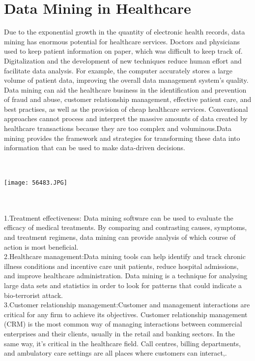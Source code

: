 \documentclass[12pt,letterpaper]{article}
\begin{document}
\section{Data Mining in Healthcare}
Due to the exponential growth in the quantity of electronic health records, data mining has enormous potential for healthcare services. Doctors and physicians used to keep patient information on paper, which was difficult to keep track of. Digitalization and the development of new techniques reduce human effort and facilitate data analysis. For example, the computer accurately stores a large volume of patient data, improving the overall data management system's quality. Data mining can aid the healthcare business in the identification and prevention of fraud and abuse, customer relationship management, effective patient care, and best practises, as well as the provision of cheap healthcare services. Conventional approaches cannot process and interpret the massive amounts of data created by healthcare transactions because they are too complex and voluminous.Data mining provides the framework and strategies for transforming these data into information that can be used to make data-driven decisions.\\
\\
 \\ \begin{center} \texttt{[image: 56483.JPG]}
\end{center}\\
\\
 1.Treatment effectiveness: Data mining software can be used to evaluate the efficacy of medical treatments. By comparing and contrasting causes, symptoms, and treatment regimens, data mining can provide analysis of which course of action is most beneficial.\\
 
 2.Healthcare management:Data mining tools can help identify and track chronic illness conditions and incentive care unit patients, reduce hospital admissions, and improve healthcare administration. Data mining is a technique for analysing large data sets and statistics in order to look for patterns that could indicate a bio-terrorist attack.\\
 
 3.Customer relationship management:Customer and management interactions are critical for any firm to achieve its objectives. Customer relationship management (CRM) is the most common way of managing interactions between commercial enterprises and their clients, usually in the retail and banking sectors. In the same way, it's critical in the healthcare field. Call centres, billing departments, and ambulatory care settings are all places where customers can interact,.\\
 
\end{document}
